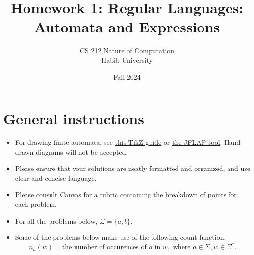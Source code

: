 \documentclass[addpoints]{exam}
\title{Homework 1: Regular Languages: Automata and Expressions}
\author{CS 212 Nature of Computation\\Habib University}
\date{Fall 2024}
\theoremstyle{claim}
\begin{document}
\maketitle

\section*{General instructions}
\begin{itemize}
\item For drawing finite automata, see  \href{https://www3.nd.edu/~kogge/courses/cse30151-fa17/Public/other/tikz_tutorial.pdf}{this TikZ guide} or \href{https://www.jflap.org}{the JFLAP tool}. Hand drawn diagrams will not be accepted.
\item Please ensure that your solutions are neatly formatted and organized, and use clear and
concise language.
\item Please consult Canvas for a rubric containing the breakdown of points for each problem.
\item For all the problems below, $\Sigma=\{a,b\}$.
\item Some of the problems below make use of the following count function.
\[
    n_a(w) =  \text{the number of occurences of } a\text{ in } w, \text{ where } a\in\Sigma,w\in\Sigma^*.
\]
\end{itemize}
\end{document}
